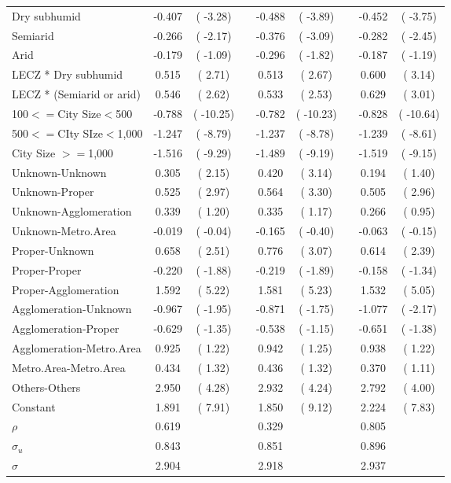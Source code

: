 \begin{center}
\begin{sidewaystable}
\begin{longtable}{lcccccccc}
Dry subhumid             & -0.407&(  -3.28)&& -0.488&(  -3.89)&& -0.452&(  -3.75)\\
Semiarid                 & -0.266&(  -2.17)&& -0.376&(  -3.09)&& -0.282&(  -2.45)\\
Arid                     & -0.179&(  -1.09)&& -0.296&(  -1.82)&& -0.187&(  -1.19)\\
LECZ * Dry subhumid      &  0.515&(   2.71)&&  0.513&(   2.67)&&  0.600&(   3.14)\\
LECZ * (Semiarid or arid)&  0.546&(   2.62)&&  0.533&(   2.53)&&  0.629&(   3.01)\\
100$<=$City Size$<$500   & -0.788&( -10.25)&& -0.782&( -10.23)&& -0.828&( -10.64)\\
500$<=$CIty SIze$<$1,000 & -1.247&(  -8.79)&& -1.237&(  -8.78)&& -1.239&(  -8.61)\\
City Size $>=$1,000      & -1.516&(  -9.29)&& -1.489&(  -9.19)&& -1.519&(  -9.15)\\
Unknown-Unknown          &  0.305&(   2.15)&&  0.420&(   3.14)&&  0.194&(   1.40)\\
Unknown-Proper           &  0.525&(   2.97)&&  0.564&(   3.30)&&  0.505&(   2.96)\\
Unknown-Agglomeration    &  0.339&(   1.20)&&  0.335&(   1.17)&&  0.266&(   0.95)\\
Unknown-Metro.Area       & -0.019&(  -0.04)&& -0.165&(  -0.40)&& -0.063&(  -0.15)\\
Proper-Unknown           &  0.658&(   2.51)&&  0.776&(   3.07)&&  0.614&(   2.39)\\
Proper-Proper            & -0.220&(  -1.88)&& -0.219&(  -1.89)&& -0.158&(  -1.34)\\
Proper-Agglomeration     &  1.592&(   5.22)&&  1.581&(   5.23)&&  1.532&(   5.05)\\
Agglomeration-Unknown    & -0.967&(  -1.95)&& -0.871&(  -1.75)&& -1.077&(  -2.17)\\
Agglomeration-Proper     & -0.629&(  -1.35)&& -0.538&(  -1.15)&& -0.651&(  -1.38)\\
Agglomeration-Metro.Area &  0.925&(   1.22)&&  0.942&(   1.25)&&  0.938&(   1.22)\\
Metro.Area-Metro.Area    &  0.434&(   1.32)&&  0.436&(   1.32)&&  0.370&(   1.11)\\
Others-Others            &  2.950&(   4.28)&&  2.932&(   4.24)&&  2.792&(   4.00)\\
Constant                 &  1.891&(   7.91)&&  1.850&(   9.12)&&  2.224&(   7.83)\\
$\rho$&  0.619&&&  0.329&&&  0.805&\\
$\sigma_u$&  0.843&&&  0.851&&&  0.896&\\
$\sigma$&  2.904&&&  2.918&&&  2.937&\\
 \hline
 \end{longtable}
 \end{sidewaystable}
 \end{center}
